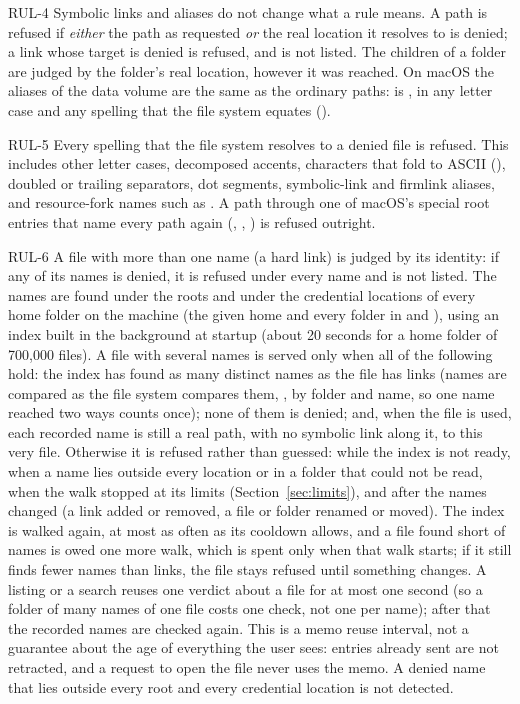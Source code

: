 \begin{req}{RUL-4}
Symbolic links and aliases do not change what a rule means.  A path is refused if
\emph{either} the path as requested \emph{or} the real location it resolves to is
denied; a link whose target is denied is refused, and is not listed.  The children of
a folder are judged by the folder's real location, however it was reached.  On macOS
the aliases of the data volume are the same as the ordinary paths:
 is , in any letter case and
any spelling that the file system equates ().
\end{req}

\begin{req}{RUL-5}
Every spelling that the file system resolves to a denied file is refused.  This
includes other letter cases, decomposed accents, characters that fold to ASCII
(), doubled or trailing separators, dot segments, symbolic-link and
firmlink aliases, and resource-fork names such as .  A
path through one of macOS's special root entries that name every path again
(, , ) is refused outright.
\end{req}

\begin{req}{RUL-6}
A file with more than one name (a hard link) is judged by its identity: if any of
its names is denied, it is refused under every name and is not listed.  The names
are found under the roots and under the credential locations of every home folder on
the machine (the given home and every folder in  and ), using an index built in the background at startup (about 20 seconds for
a home folder of 700{,}000 files).  A file with several names is served only when
all of the following hold: the index has found as many distinct names as the file has
links (names are compared as the file system compares them, , by folder and
name, so one name reached two ways counts once); none of them is denied; and, when
the file is used, each recorded name is still a real path, with no symbolic link
along it, to this very file.  Otherwise it is refused rather than guessed: while the
index is not ready, when a name lies outside every location or in a folder that could
not be read, when the walk stopped at its limits (Section~\ref{sec:limits}), and after
the names changed (a link added or removed, a file or folder renamed or moved).
The index is walked again, at most as often as its cooldown allows, and a file
found short of names is owed one more walk, which is spent only when that walk
starts; if it still finds fewer names than links, the file stays refused until
something changes.  A listing or a search reuses one verdict about a file for at most
one second (so a folder of many names of one file costs one check, not one per
name); after that the recorded names are checked again.  This is a memo reuse interval, not a guarantee about the age of everything the
user sees: entries already sent are not retracted, and a request to open the file never
uses the memo.  A denied name
that lies outside every root and every credential location is not detected.
\end{req}

